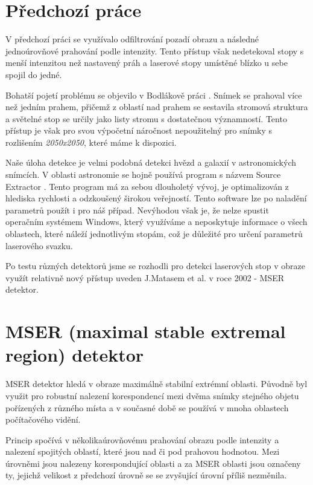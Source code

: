 \section*{Předchozí práce}

V předchozí práci \cite{Drapela} se využívalo odfiltrování pozadí obrazu a následné jednoúrovňové prahování podle intenzity. Tento přístup však nedetekoval stopy s menší intenzitou než nastavený práh a laserové stopy umístěné blízko u sebe spojil do jedné. 

Bohatší pojetí problému se objevilo v Bodlákově práci \cite{Bodlak2005}. Snímek se prahoval více než jedním prahem, přičemž z oblastí nad prahem se sestavila stromová struktura a světelné stop se určily jako listy stromu s dostatečnou významností. Tento přístup je však pro svou výpočetní náročnost nepoužitelný pro snímky s rozlišením \textit{2050x2050}, které máme k dispozici. 

Naše úloha detekce je velmi podobná detekci hvězd a galaxií v astronomických snímcích. V oblasti astronomie se hojně používá program s názvem Source Extractor \cite{SEXarticle}. Tento program má za sebou dlouholetý vývoj, je optimalizován z hlediska rychlosti a odzkoušený širokou veřejností. Tento software lze po naladění parametrů použít i pro náš případ. Nevýhodou však je, že nelze spustit operačním systémem Windows, který využíváme a neposkytuje informace o  všech oblastech, které náleží jednotlivým stopám, což je důležité pro určení parametrů laserového svazku.  

Po testu různých detektorů jsme se rozhodli pro detekci laserových stop v obraze využít relativně nový přístup uveden J.Matasem et al. \cite{Matas} v roce 2002 - MSER detektor. 

\newpage
\section*{MSER (maximal stable extremal region) detektor}

MSER detektor hledá v obraze maximálně stabilní extrémní oblasti. Původně byl využit pro robustní nalezení korespondencí mezi dvěma snímky stejného objetu pořízených z různého místa a v současné době se používá v mnoha oblastech počítačového vidění.  

Princip spočívá v několikaúrovňovému prahování obrazu podle intenzity a nalezení spojitých oblastí, které jsou nad či pod prahovou hodnotou. Mezi úrovněmi jsou nalezeny korespondující oblasti a za MSER oblasti jsou označeny ty, jejichž velikost z předchozí úrovně se se zvyšující úrovní příliš nezměnila. 

